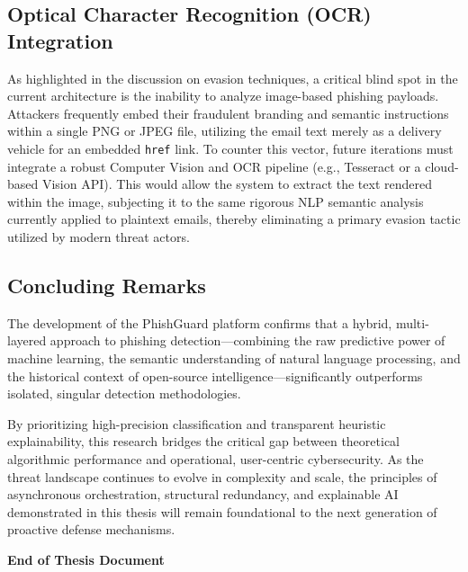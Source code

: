\subsection{Optical Character Recognition (OCR)
Integration}\label{optical-character-recognition-ocr-integration}

As highlighted in the discussion on evasion techniques, a critical blind
spot in the current architecture is the inability to analyze image-based
phishing payloads. Attackers frequently embed their fraudulent branding
and semantic instructions within a single PNG or JPEG file, utilizing
the email text merely as a delivery vehicle for an embedded
\texttt{href} link. To counter this vector, future iterations must
integrate a robust Computer Vision and OCR pipeline (e.g., Tesseract or
a cloud-based Vision API). This would allow the system to extract the
text rendered within the image, subjecting it to the same rigorous NLP
semantic analysis currently applied to plaintext emails, thereby
eliminating a primary evasion tactic utilized by modern threat actors.

\subsection{Concluding Remarks}\label{concluding-remarks}

The development of the PhishGuard platform confirms that a hybrid,
multi-layered approach to phishing detection---combining the raw
predictive power of machine learning, the semantic understanding of
natural language processing, and the historical context of open-source
intelligence---significantly outperforms isolated, singular detection
methodologies.

By prioritizing high-precision classification and transparent heuristic
explainability, this research bridges the critical gap between
theoretical algorithmic performance and operational, user-centric
cybersecurity. As the threat landscape continues to evolve in complexity
and scale, the principles of asynchronous orchestration, structural
redundancy, and explainable AI demonstrated in this thesis will remain
foundational to the next generation of proactive defense mechanisms.

\textbf{End of Thesis Document}

